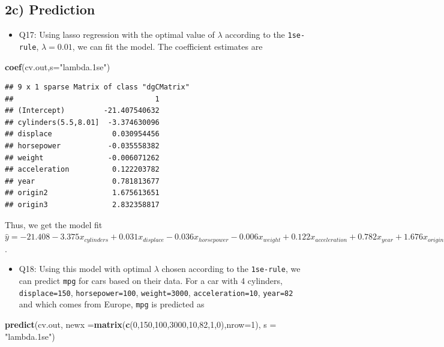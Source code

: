 \documentclass[]{article}
\newenvironment{Shaded}{\begin{snugshade}}{\end{snugshade}}
\newcommand{\KeywordTok}[1]{\textcolor[rgb]{0.13,0.29,0.53}{\textbf{#1}}}
\newcommand{\DataTypeTok}[1]{\textcolor[rgb]{0.13,0.29,0.53}{#1}}
\newcommand{\DecValTok}[1]{\textcolor[rgb]{0.00,0.00,0.81}{#1}}
\newcommand{\StringTok}[1]{\textcolor[rgb]{0.31,0.60,0.02}{#1}}
\newcommand{\NormalTok}[1]{#1}
\providecommand{\tightlist}{%
  \setlength{\itemsep}{0pt}\setlength{\parskip}{0pt}}
\begin{document}
\subsection{2c) Prediction}\label{c-prediction}

\begin{itemize}
\tightlist
\item
  Q17: Using lasso regression with the optimal value of \(\lambda\)
  according to the \texttt{1se-rule}, \(\lambda=0.01\), we can fit the
  model. The coefficient estimates are
\end{itemize}

\begin{Shaded}
\begin{Highlighting}[]
\KeywordTok{coef}\NormalTok{(cv.out,}\DataTypeTok{s=}\StringTok{"lambda.1se"}\NormalTok{)}
\end{Highlighting}
\end{Shaded}

\begin{verbatim}
## 9 x 1 sparse Matrix of class "dgCMatrix"
##                                 1
## (Intercept)         -21.407540632
## cylinders(5.5,8.01]  -3.374630096
## displace              0.030954456
## horsepower           -0.035558382
## weight               -0.006071262
## acceleration          0.122203782
## year                  0.781813677
## origin2               1.675613651
## origin3               2.832358817
\end{verbatim}

Thus, we get the model fit
\(\hat{y}=-21.408-3.375x_{cylinders}+0.031x_{displace}-0.036x_{horsepower}-0.006x_{weight}+0.122x_{acceleration}+0.782x_{year}+1.676x_{origin2}+2.832x_{origin3}\).

\begin{itemize}
\tightlist
\item
  Q18: Using this model with optimal \(\lambda\) chosen according to the
  \texttt{1se-rule}, we can predict \texttt{mpg} for cars based on their
  data. For a car with 4 cylinders, \texttt{displace=150},
  \texttt{horsepower=100}, \texttt{weight=3000},
  \texttt{acceleration=10}, \texttt{year=82} and which comes from
  Europe, \texttt{mpg} is predicted as
\end{itemize}

\begin{Shaded}
\begin{Highlighting}[]
\KeywordTok{predict}\NormalTok{(cv.out, }\DataTypeTok{newx =}\KeywordTok{matrix}\NormalTok{(}\KeywordTok{c}\NormalTok{(}\DecValTok{0}\NormalTok{,}\DecValTok{150}\NormalTok{,}\DecValTok{100}\NormalTok{,}\DecValTok{3000}\NormalTok{,}\DecValTok{10}\NormalTok{,}\DecValTok{82}\NormalTok{,}\DecValTok{1}\NormalTok{,}\DecValTok{0}\NormalTok{),}\DataTypeTok{nrow=}\DecValTok{1}\NormalTok{), }\DataTypeTok{s =} \StringTok{"lambda.1se"}\NormalTok{)}
\end{Highlighting}
\end{Shaded}
\end{document}
